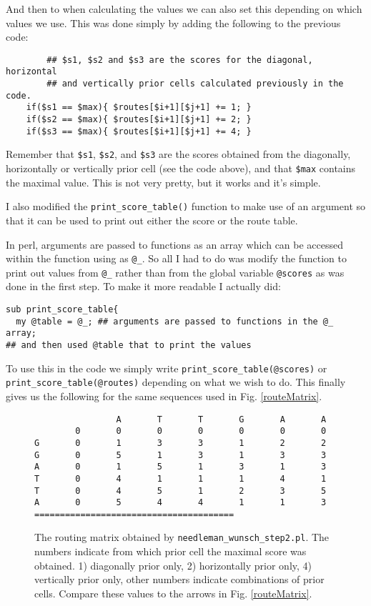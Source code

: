 \documentclass[11pt]{article}
\renewcommand\scriptsize\normalsize
\begin{document}
And then to when calculating the values we can also set this depending on
which values we use. This was done simply by adding the following to the
previous code:

\begin{verbatim}
        ## $s1, $s2 and $s3 are the scores for the diagonal, horizontal
        ## and vertically prior cells calculated previously in the code.
	if($s1 == $max){ $routes[$i+1][$j+1] += 1; }
	if($s2 == $max){ $routes[$i+1][$j+1] += 2; }
	if($s3 == $max){ $routes[$i+1][$j+1] += 4; } 
\end{verbatim}

Remember that \texttt{\$s1}, \texttt{\$s2}, and \texttt{\$s3} are the scores
obtained from the diagonally, horizontally or vertically prior cell (see the code above), and that
\texttt{\$max} contains the maximal value. This is not very pretty, but it
works and it's simple.

I also modified the \verb|print_score_table()| function to make use of an
argument so that it can be used to print out either the score or the route table. 

In perl, arguments are passed to functions as an array which can
be accessed within the function using as \verb|@_|. So all I had to do was
modify the function to print out values from \verb|@_| rather than from
the global variable \texttt{@scores} as was done in the first step. To make it
more readable I actually did:

\begin{verbatim}
sub print_score_table{
  my @table = @_; ## arguments are passed to functions in the @_ array;
## and then used @table that to print the values
\end{verbatim}

To use this in the code we simply write \verb|print_score_table(@scores)| or 
\verb|print_score_table(@routes)| depending on what we wish to do.
This finally gives us the following for the same sequences used in Fig. \ref{routeMatrix}.
\pagebreak

\begin{figure}[ht]
\begin{verbatim}
                A       T       T       G       A       A
        0       0       0       0       0       0       0
G       0       1       3       3       1       2       2
G       0       5       1       3       1       3       3
A       0       1       5       1       3       1       3
T       0       4       1       1       1       4       1
T       0       4       5       1       2       3       5
A       0       5       4       4       1       1       3
=======================================
\end{verbatim}
\caption{The routing matrix obtained by \texttt{needleman\_wunsch\_step2.pl}. 
  The numbers indicate from which prior cell the maximal score was obtained.
  1) diagonally prior only, 2) horizontally prior only, 4) vertically prior only,
  other numbers indicate combinations of prior cells. Compare these values to
  the arrows in Fig. \ref{routeMatrix}.}
\label{s2Table}
\end{figure}
\end{document}
